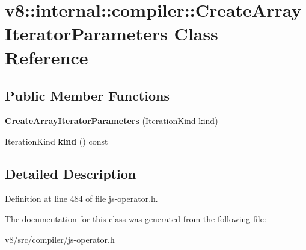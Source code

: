 \hypertarget{classv8_1_1internal_1_1compiler_1_1CreateArrayIteratorParameters}{}\section{v8\+:\+:internal\+:\+:compiler\+:\+:Create\+Array\+Iterator\+Parameters Class Reference}
\label{classv8_1_1internal_1_1compiler_1_1CreateArrayIteratorParameters}
\subsection*{Public Member Functions}
\begin{DoxyCompactItemize}
\item 
\mbox{\label{classv8_1_1internal_1_1compiler_1_1CreateArrayIteratorParameters_a8b01d376e335767f3b43b745dd2e10e6}} 
{\bfseries Create\+Array\+Iterator\+Parameters} (Iteration\+Kind kind)
\item 
\mbox{\label{classv8_1_1internal_1_1compiler_1_1CreateArrayIteratorParameters_abdd3111e16300e2f85c2e67cd75b5406}} 
Iteration\+Kind {\bfseries kind} () const
\end{DoxyCompactItemize}


\subsection{Detailed Description}


Definition at line 484 of file js-\/operator.\+h.



The documentation for this class was generated from the following file\+:\begin{DoxyCompactItemize}
\item 
v8/src/compiler/js-\/operator.\+h\end{DoxyCompactItemize}
